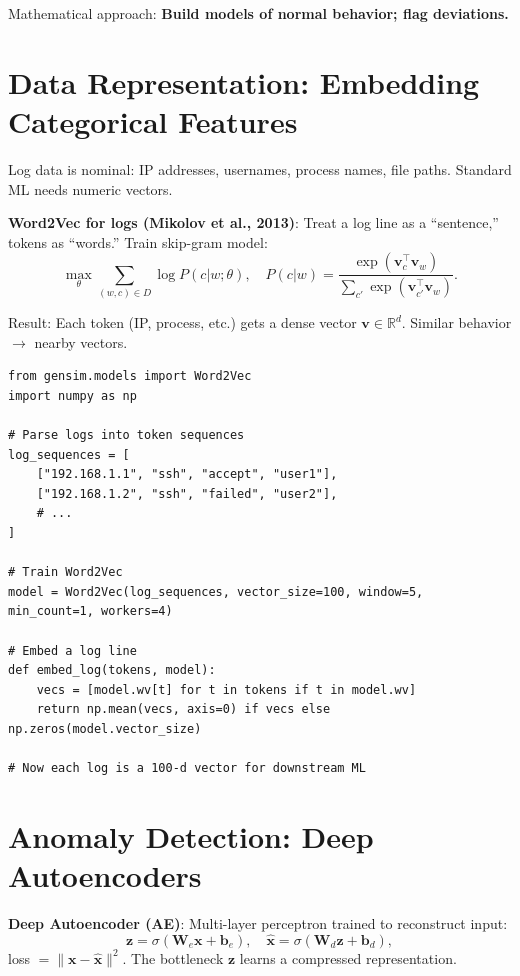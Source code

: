 Mathematical approach: \textbf{Build models of normal behavior; flag deviations.}

\section{Data Representation: Embedding Categorical Features}
\label{sec:cyber:embedding} \cite{emanuello2022cyber}

Log data is nominal: IP addresses, usernames, process names, file paths. Standard ML needs numeric vectors.

\textbf{Word2Vec for logs (Mikolov et al., 2013)}: Treat a log line as a ``sentence,'' tokens as ``words.'' Train skip-gram model:
\[
\max_{\theta} \sum_{(w,c) \in D} \log P(c|w;\theta), \quad P(c|w) = \frac{\exp(\bm{v}_c^\top \bm{v}_w)}{\sum_{c'} \exp(\bm{v}_{c'}^\top \bm{v}_w)}.
\]

Result: Each token (IP, process, etc.) gets a dense vector $\bm{v} \in \mathbb{R}^d$. Similar behavior $\to$ nearby vectors.

\begin{lstlisting}[style=python,caption=Log embedding with Word2Vec]
from gensim.models import Word2Vec
import numpy as np

# Parse logs into token sequences
log_sequences = [
    ["192.168.1.1", "ssh", "accept", "user1"],
    ["192.168.1.2", "ssh", "failed", "user2"],
    # ...
]

# Train Word2Vec
model = Word2Vec(log_sequences, vector_size=100, window=5, min_count=1, workers=4)

# Embed a log line
def embed_log(tokens, model):
    vecs = [model.wv[t] for t in tokens if t in model.wv]
    return np.mean(vecs, axis=0) if vecs else np.zeros(model.vector_size)

# Now each log is a 100-d vector for downstream ML
\end{lstlisting}

\section{Anomaly Detection: Deep Autoencoders}
\label{sec:cyber:ae} \cite{emanuello2022cyber}

\textbf{Deep Autoencoder (AE)}: Multi-layer perceptron trained to reconstruct input:
\[
\bm{z} = \sigma(\bm{W}_e \bm{x} + \bm{b}_e), \quad \hat{\bm{x}} = \sigma(\bm{W}_d \bm{z} + \bm{b}_d),
\]
loss $= \|\bm{x} - \hat{\bm{x}}\|^2$. The bottleneck $\bm{z}$ learns a compressed representation.

